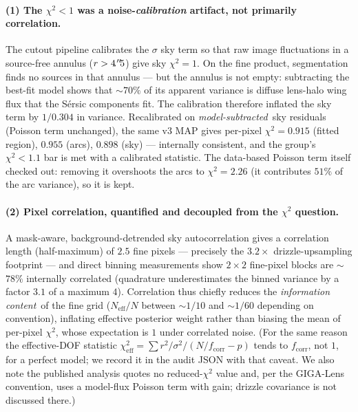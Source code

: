\documentclass[11pt,letterpaper]{article}
\begin{document}
\paragraph{(1) The $\chi^{2}<1$ was a noise-{\it calibration} artifact,
not primarily correlation.} The cutout pipeline calibrates the
$\sigma$ sky term so that raw image fluctuations in a source-free
annulus ($r>4\mbox{$\!\!\,.{}^{\prime\prime}\!\!\,$}5$) give sky $\chi^{2}=1$. On the fine product,
segmentation finds no sources in that annulus --- but the annulus is
not empty: subtracting the best-fit model shows that $\sim$$70\%$ of
its apparent variance is diffuse lens-halo wing flux that the
S\'{e}rsic components fit. The calibration therefore inflated the sky
term by $1/0.304$ in variance. Recalibrated on {\it model-subtracted}\
sky residuals (Poisson term unchanged), the same v3 MAP gives
per-pixel $\chi^{2} = 0.915$ (fitted region), $0.955$ (arcs), $0.898$
(sky) --- internally consistent, and the group's $\chi^{2}<1.1$ bar is
met with a calibrated statistic. The data-based Poisson term itself
checked out: removing it overshoots the arcs to $\chi^{2}=2.26$
(it contributes $51\%$ of the arc variance), so it is kept.

\paragraph{(2) Pixel correlation, quantified and decoupled from the
$\chi^{2}$ question.} A mask-aware, background-detrended sky
autocorrelation gives a correlation length (half-maximum) of $2.5$
fine pixels --- precisely the $3.2\times$ drizzle-upsampling footprint
--- and direct binning measurements show $2\times2$ fine-pixel blocks
are $\sim$$78\%$ internally correlated (quadrature underestimates the
binned variance by a factor $3.1$ of a maximum $4$). Correlation thus
chiefly reduces the {\it information content}\ of the fine grid
($N_{\mathrm{eff}}/N$ between $\sim$$1/10$ and $\sim$$1/60$ depending
on convention), inflating effective posterior weight rather than
biasing the mean of per-pixel $\chi^{2}$, whose expectation is $1$
under correlated noise. (For the same reason the effective-DOF
statistic $\chi^{2}_{\mathrm{eff}} = \sum r^{2}/\sigma^{2} /
(N/f_{\mathrm{corr}} - p)$ tends to $f_{\mathrm{corr}}$, not $1$, for
a perfect model; we record it in the audit JSON with that caveat. We
also note the published analysis quotes no reduced-$\chi^{2}$ value
and, per the GIGA-Lens convention, uses a model-flux Poisson term with
gain; drizzle covariance is not discussed there.)
\end{document}
